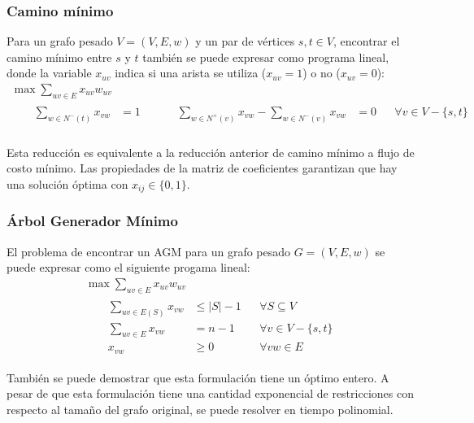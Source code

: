 \documentclass[a4paper]{report}
\begin{document}
\subsubsection{Camino mínimo}

Para un grafo pesado $V = (V, E, w)$ y un par de vértices $s, t \in V$, encontrar el camino mínimo entre $s$ y $t$ también se puede expresar como programa lineal, donde la variable $x_{uv}$ indica si una arista se utiliza ($x_{uv} = 1$) o no ($x_{uv} = 0$):
\begin{gather*}
    \max{\sum_{uv \in E} x_{uv} w_{uv}} \\
    \begin{flalign*}
         &  & \sum_{w \in N^-(t)} x_{vw}                              & = 1 &  &
         &  & \sum_{w \in N^+(v)} x_{vw} - \sum_{w \in N^-(v)} x_{vw} & = 0 &  & \forall v \in V - \{s, t\} \\
    \end{flalign*}
\end{gather*}

Esta reducción es equivalente a la reducción anterior de camino mínimo a flujo de costo mínimo. Las propiedades de la matriz de coeficientes garantizan que hay una solución óptima con $x_{ij} \in \{0, 1\}$.

\subsubsection{Árbol Generador Mínimo}

El problema de encontrar un AGM para un grafo pesado $G = (V, E, w)$ se puede expresar como el siguiente progama lineal:
\begin{gather*}
    \max{\sum_{uv \in E} x_{uv} w_{uv}} \\
    \begin{flalign*}
         &  & \sum_{uv \in E(S)} x_{vw} & \leq |S| - 1 &  & \forall S \subseteq V      \\
         &  & \sum_{uv \in E} x_{vw}    & = n - 1      &  & \forall v \in V - \{s, t\} \\
         &  & x_{vw}                    & \geq 0       &  & \forall vw \in E
    \end{flalign*}
\end{gather*}

También se puede demostrar que esta formulación tiene un óptimo entero. A pesar de que esta formulación tiene una cantidad exponencial de restricciones con respecto al tamaño del grafo original, se puede resolver en tiempo polinomial.
\end{document}
